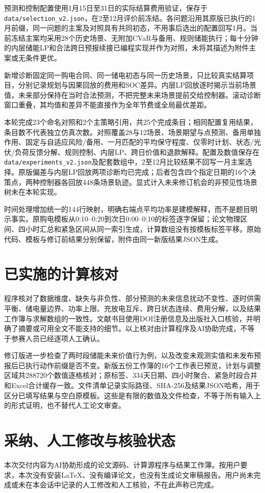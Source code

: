\documentclass[UTF8,a4paper,11pt]{ctexart}
\begin{document}
预测和控制配置使用1月15日至31日的实际结算费用验证，保存于\texttt{data/selection\_v2.json}，在2至12月评价前冻结。各问题沿用其原版已执行的1月前缀，同一问题的主案及对照具有共同初态，不用事后选出的配置回写1月。当前冻结主案均采用28个历史场景、无附加CVaR与备用、规则储能执行；每十分钟的内层储能LP和合法跨日预报续接已编程实现并作为对照，未将其描述为附件主案或无条件更优。

新增诊断固定同一购电合同、同一储电初态与同一历史场景，只比较真实结算项目，分别记录规划与因果回放的费用和SOC差异。内层LP回放逐时揭示当前场景值，未来部分保持在当时合法预测，不把完整未来场景提前交给控制器。滚动诊断窗口重叠，其均值和差异不能直接作为全年节费或全局最优差距。

本轮完成23个命名对照和2个主策略引用，共25个完成条目；相同配置复用结果，条目数不代表独立仿真次数。对照覆盖28与12场景、场景期望与点预测、备用单独作用、固定与自适应风险/备用、一月匹配的平均保守程度、仅零时计划、状态/光伏/负荷反馈分解、规则控制、内层LP、跨日价值和退款解释。配置及数值保存在\texttt{data/experiments\_v2.json}及配套数组中，2至12月比较结果不回写一月主案选择。原版偏差与内层LP回放两项诊断均已完成；后者包含四个指定日期的16个决策点，两种控制器各回放448条场景轨迹。显式计入未来修订机会的非预见性场景树未在本轮实现。

时间处理增加统一的144行映射，明确右端点平均功率是建模解释，而不是题目明示事实。原购电模板从0:10--0:20到次日0:00--0:10的标签逐字保留；论文物理区间、四小时汇总和紧急区间从同一索引生成，计算数组没有按模板标签平移。原始代码、模板与修订前结果分别保留，附件由同一新版结果JSON生成。

\section{已实施的计算核对}
程序核对了数据维度、缺失与非负性、部分预测的未来信息扰动不变性、逐时供需平衡、储电量边界、功率上限、充放电互斥、跨日状态连续、费用分解，以及结果工作簿与求解数组的一致性。文献书目使用DOI注册信息及出版社入口核验，并明确了摘要或可用全文不能支持的细节。以上核对由计算程序及AI协助完成，不等于参赛人员已经逐项人工确认。

修订版进一步检查了两时段储能未来价值行为例，以及改变未观测实值和未发布预报后已执行动作前缀是否不变。新版五份工作簿的16个工作表已预览，计划与调整区域共288720个数值逐格核对；原标签、334天日期、四小时聚合、紧急时段合并和Excel合计缓存一致。文件清单记录实际路径、SHA-256及结果JSON哈希，用于区分已填写结果与空白原模板。这些是有限的数值及文件检查，不等于所有输入上的形式证明，也不替代人工论文审查。

\section{采纳、人工修改与核验状态}
本次交付内容为AI协助形成的论文源码、计算源程序与结果工作簿。按用户要求，本次没有安装LaTeX、没有编译论文，也没有生成论文审稿报告。用户尚未完成或未在本会话中记录的人工修改和人工核验，不在此声称已完成。
\end{document}
